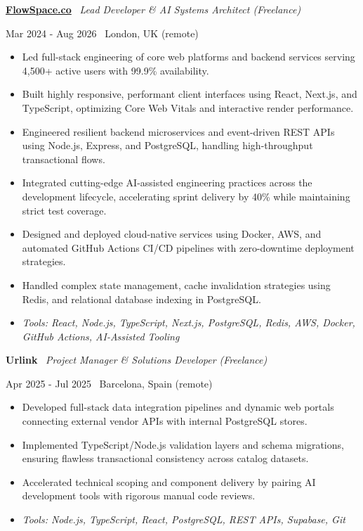 \documentclass[a4paper,10pt]{article}
\newcommand{\role}[4]{%
  \vspace{2pt}\noindent
  \begin{minipage}[t]{0.70\textwidth}\raggedright\textbf{#1} \textbullet\ \textit{#3}\end{minipage}%
  \hfill
  \begin{minipage}[t]{0.28\textwidth}\raggedleft\footnotesize\color{gray}#2 \textbullet\ #4\end{minipage}%
  \vspace{1pt}%
}
\begin{document}
\role{\href{https://flowspace.co}{FlowSpace.co}}{Mar 2024 - Aug 2026}{Lead Developer \& AI Systems Architect (Freelance)}{London, UK (remote)}
\begin{itemize}
  \item Led full-stack engineering of core web platforms and backend services serving 4,500+ active users with 99.9\% availability.
  \item Built highly responsive, performant client interfaces using React, Next.js, and TypeScript, optimizing Core Web Vitals and interactive render performance.
  \item Engineered resilient backend microservices and event-driven REST APIs using Node.js, Express, and PostgreSQL, handling high-throughput transactional flows.
  \item Integrated cutting-edge AI-assisted engineering practices across the development lifecycle, accelerating sprint delivery by 40\% while maintaining strict test coverage.
  \item Designed and deployed cloud-native services using Docker, AWS, and automated GitHub Actions CI/CD pipelines with zero-downtime deployment strategies.
  \item Handled complex state management, cache invalidation strategies using Redis, and relational database indexing in PostgreSQL.
  \item \textit{Tools: React, Node.js, TypeScript, Next.js, PostgreSQL, Redis, AWS, Docker, GitHub Actions, AI-Assisted Tooling}
\end{itemize}

\role{Urlink}{Apr 2025 - Jul 2025}{Project Manager \& Solutions Developer (Freelance)}{Barcelona, Spain (remote)}
\begin{itemize}
  \item Developed full-stack data integration pipelines and dynamic web portals connecting external vendor APIs with internal PostgreSQL stores.
  \item Implemented TypeScript/Node.js validation layers and schema migrations, ensuring flawless transactional consistency across catalog datasets.
  \item Accelerated technical scoping and component delivery by pairing AI development tools with rigorous manual code reviews.
  \item \textit{Tools: Node.js, TypeScript, React, PostgreSQL, REST APIs, Supabase, Git}
\end{itemize}
\end{document}
